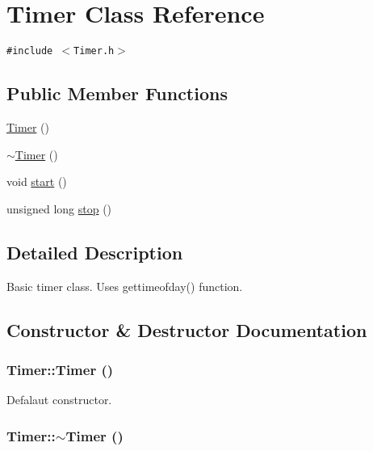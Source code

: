 \hypertarget{classTimer}{
\section{Timer Class Reference}
\label{classTimer}
}
{\tt \#include $<$Timer.h$>$}

\subsection*{Public Member Functions}
\begin{CompactItemize}
\item 
\hyperlink{classTimer_5f16e8da27d2a5a5242dead46de05d97}{Timer} ()
\item 
\hyperlink{classTimer_14fa469c4c295c5fa6e66a4ad1092146}{$\sim$Timer} ()
\item 
void \hyperlink{classTimer_3a8b5272198d029779dc9302a54305a8}{start} ()
\item 
unsigned long \hyperlink{classTimer_6593c73e68343edf6ce2d1c14302c44a}{stop} ()
\end{CompactItemize}


\subsection{Detailed Description}
Basic timer class. Uses gettimeofday() function. 

\subsection{Constructor \& Destructor Documentation}
\hypertarget{classTimer_5f16e8da27d2a5a5242dead46de05d97}{
\subsubsection[{Timer}]{\setlength{\rightskip}{0pt plus 5cm}Timer::Timer ()}}
\label{classTimer_5f16e8da27d2a5a5242dead46de05d97}


Defalaut constructor. \hypertarget{classTimer_14fa469c4c295c5fa6e66a4ad1092146}{
\subsubsection[{$\sim$Timer}]{\setlength{\rightskip}{0pt plus 5cm}Timer::$\sim$Timer ()}}
\label{classTimer_14fa469c4c295c5fa6e66a4ad1092146}


